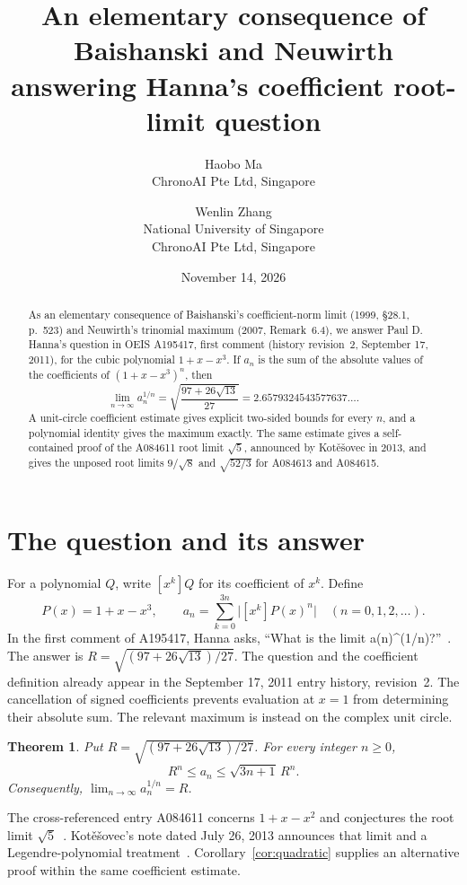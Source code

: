 \documentclass[11pt]{article}
\title{An elementary consequence of Baishanski and Neuwirth\\
answering Hanna's coefficient root-limit question}
\author{Haobo Ma\\\small ChronoAI Pte Ltd, Singapore
\and Wenlin Zhang\\\small National University of Singapore\\
\small ChronoAI Pte Ltd, Singapore}
\date{November 14, 2026}
\newtheorem{theorem}{Theorem}
\begin{document}
\maketitle
\begin{abstract}
As an elementary consequence of Baishanski's coefficient-norm limit
(1999, \S28.1, p.~523) and Neuwirth's trinomial maximum
(2007, Remark~6.4), we answer Paul D. Hanna's question in OEIS A195417,
first comment (history revision~2, September 17, 2011),
for the cubic polynomial $1+x-x^3$.
If $a_n$ is the sum of the absolute values of the coefficients of
$(1+x-x^3)^n$, then
\[
 \lim_{n\to\infty}a_n^{1/n}
 =\sqrt{\frac{97+26\sqrt{13}}{27}}
 =2.6579324543577637\ldots.
\]
A unit-circle coefficient estimate gives explicit two-sided bounds for
every $n$, and a polynomial identity gives the maximum exactly.
The same estimate gives a self-contained proof of the A084611
root limit $\sqrt5$, announced by Kot\v{e}\v{s}ovec in 2013,
and gives the unposed root limits
$9/\sqrt8$ and $\sqrt{52/3}$ for A084613 and A084615.
\end{abstract}

\section{The question and its answer}
For a polynomial $Q$, write $[x^k]Q$ for its coefficient of $x^k$.
Define
\[
 P(x)=1+x-x^3,\qquad
 a_n=\sum_{k=0}^{3n}\bigl|[x^k]P(x)^n\bigr|
 \quad(n=0,1,2,\ldots).
\]
In the first comment of A195417, Hanna asks, ``What is the limit
a(n)\^{}(1/n)?''~\cite{hanna195417}. The answer is
$R=\sqrt{(97+26\sqrt{13})/27}$. The question and the coefficient definition
already appear in the September 17, 2011 entry history, revision~2.
The cancellation of signed coefficients prevents evaluation at $x=1$
from determining their absolute sum. The relevant maximum is instead
on the complex unit circle.

\begin{theorem}\label{thm:main}
Put $R=\sqrt{(97+26\sqrt{13})/27}$. For every integer $n\geq0$,
\begin{equation}\label{eq:bounds}
 R^n\leq a_n\leq\sqrt{3n+1}\,R^n.
\end{equation}
Consequently, $\lim_{n\to\infty}a_n^{1/n}=R$.
\end{theorem}

The cross-referenced entry A084611 concerns $1+x-x^2$ and conjectures
the root limit $\sqrt5$~\cite{hanna84611}. Kot\v{e}\v{s}ovec's note dated
July 26, 2013 announces that limit and a Legendre-polynomial
treatment~\cite{kotesovec}.
Corollary~\ref{cor:quadratic} supplies an alternative proof within the
same coefficient estimate.
\end{document}
